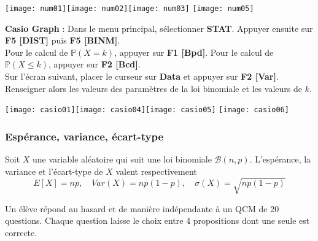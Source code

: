 \documentclass[11pt,fleqn, openany]{book} %
\begin{document}
\vskip5pt

\texttt{[image: num01]}\hfill \texttt{[image: num02]}\hfill \texttt{[image: num03]} \hfill \texttt{[image: num05]}

\textbf{Casio Graph} : Dans le menu principal, sélectionner \textbf{STAT}. Appuyer ensuite sur \textbf{F5 [DIST]} puis \textbf{F5 [BINM]}.\\
Pour le calcul de $\mathbb{P}(X=k)$, appuyer sur \textbf{F1 [Bpd]}. Pour le calcul de $\mathbb{P}(X \leqslant k)$, appuyer sur \textbf{F2 [Bcd]}.\\
Sur l'écran suivant, placer le curseur sur \textbf{Data} et appuyer sur \textbf{F2 [Var]}. Renseigner alors les valeurs des paramètres de la loi binomiale et les valeurs de $k$.

\texttt{[image: casio01]}\hfill \texttt{[image: casio04]}\hfill \texttt{[image: casio05]} \hfill \texttt{[image: casio06]}


\subsubsection{Espérance, variance, écart-type}

\begin{proposition}Soit $X$ une variable aléatoire qui suit une loi binomiale $\mathcal{B}(n,p)$. L'espérance, la variance et l'écart-type de $X$ valent respectivement \[E[X]=np, \quad Var(X)=np(1-p), \quad \sigma(X)=\sqrt{np(1-p)}\]\end{proposition}

\begin{example}Un élève répond au hasard et de manière indépendante à un QCM de 20 questions. Chaque question laisse le choix entre 4 propositions dont une seule est correcte.

\vskip50pt
\end{example}
\end{document}

